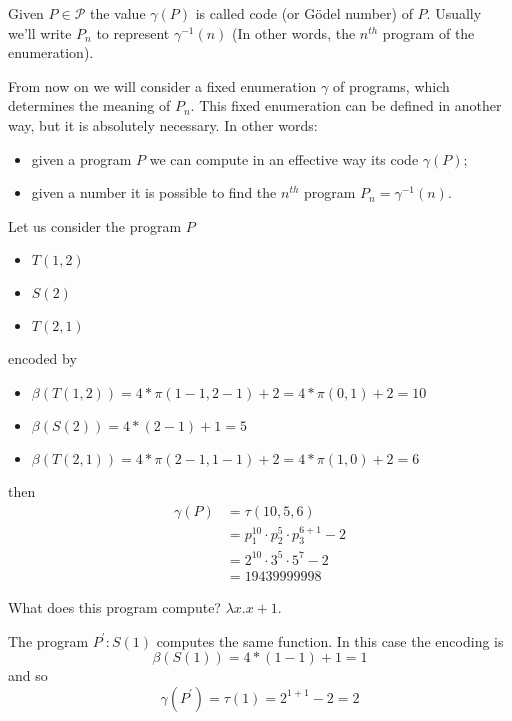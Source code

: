 \begin{definition}
  Given $P \in \mathcal{P}$ the value $\gamma(P)$ is called code (or
  Gödel number) of $P$. Usually we'll write $P_n$ to represent
  $\gamma^{-1}(n)$ (In other words, the $n^{th}$ program of the
  enumeration).
\end{definition}

\begin{observation}
  From now on we will consider a fixed
enumeration $\gamma$ of programs, which
determines the meaning of $P_n$. This fixed enumeration can be
defined in another way, but it is absolutely necessary. In other words:
\begin{itemize}
\item given a program $P$ we can compute in an effective way its code
  $\gamma(P)$;
\item given a number it is possible to find the $n^{th}$ program
  $P_n = \gamma^{-1}(n)$.
  
\end{itemize}
\end{observation}

\begin{example}
  Let us consider the program $P$
  \begin{itemize}
  \item[] $T(1,2)$
  \item[] $S(2)$
  \item[] $T(2,1)$
  \end{itemize}
  encoded by
  \begin{itemize}
  \item[] $\beta(T(1,2)) = 4 * \pi(1-1,2-1) + 2 = 4 * \pi(0,1) + 2 = 10$
  \item[] $\beta(S(2)) = 4 * (2-1) + 1 = 5$
  \item[] $\beta(T(2,1)) = 4 * \pi(2-1,1-1) + 2 = 4 * \pi(1,0) + 2 = 6$
  \end{itemize}
  then
      \begin{align*}
        \gamma(P) & = \tau(10,5,6) \\
                  & = p_1^{10} \cdot p_2^5 \cdot p_3^{6+1} - 2 \\
                  & = 2^{10} \cdot 3^5 \cdot 5^7 -2 \\
                  & = 19439999998
      \end{align*}

  What does this program compute? $\lambda x . x+1$.

  The program $P^\prime : S(1)$ computes the same function. 
  In this case the encoding is
  \[\beta(S(1)) = 4 * (1-1) + 1 = 1\] and so
  \[\gamma(P^\prime) = \tau(1) = 2^{1+1} - 2 = 2\]
\end{example}


